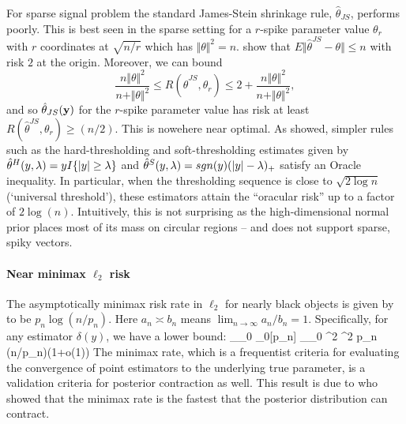 \documentclass[11pt]{article}
\begin{document}
For sparse signal problem the standard James-Stein shrinkage rule, $ \hat{\theta}_{JS} $, performs poorly. This is best seen in the sparse setting for a $r$-spike parameter value $ \theta_r$ with $r$ coordinates at $ \sqrt{n/r} $ which has $ \Vert \theta \Vert^2 =n $. \citet{johnstone2004needles} show that $ E \Vert \hat{\theta}^{JS} - \theta \Vert \leq n $ with risk $2$ at the origin. Moreover, we can bound
\[
\frac{n \Vert \theta \Vert^2}{ n + \Vert \theta \Vert^2} \leq R \left ( \hat{\theta}^{JS} , \theta_r \right ) \leq
2 + \frac{n \Vert \theta \Vert^2}{ n + \Vert \theta \Vert^2},
\]
and so ${\hat{\theta}}_{JS}{}({\bf y})$ for the $r$-spike parameter value has risk at least $ R \left( \hat{\theta}^{JS} , \theta_r \right) \geq (n/2)$. This is nowehere near optimal. As \citet{donoho1994ideal} showed, simpler rules such as the hard-thresholding and soft-thresholding estimates given by $\hat{\theta}^{H}(y,\lambda) = y I\{\lvert y\rvert \ge \lambda \}$ and $\hat{\theta}^{S}(y,\lambda) = sgn(y) (\lvert y\rvert - \lambda)_{+}$ satisfy an Oracle inequality. In particular, when the thresholding sequence is close to $\sqrt{2\log n}$ (`universal threshold'), these estimators attain the ``oracular risk'' up to a factor of $2\log(n)$. Intuitively, this is not surprising as the high-dimensional normal prior places most of its mass on circular regions -- and does not support sparse, spiky vectors. 

\paragraph{Near minimax $\ell_2$ risk}

The asymptotically minimax risk rate in $\ell_2$ for nearly black objects is given by \citet{donoho1992maximum} to be $p_n \log \left ( n / p_n \right )$. Here $a_n \asymp b_n$ means $\lim_{n\to\infty} a_n/b_n=1$. Specifically, for any estimator $\delta(y)$, we have a lower bound: 
\beq
\sup_{\theta_0 \in \ell_0[p_n]} \E_{\theta_0} ^2  \sigma^2 p_n \log(n/p_n)(1+o(1))
\eeq
The minimax rate, which is a frequentist criteria for evaluating the convergence of point estimators to the underlying true parameter, is a validation criteria for posterior contraction as well. This result is due to \citet{ghosal2000} who showed that the minimax rate is the fastest that the posterior distribution can contract. 
\end{document}
